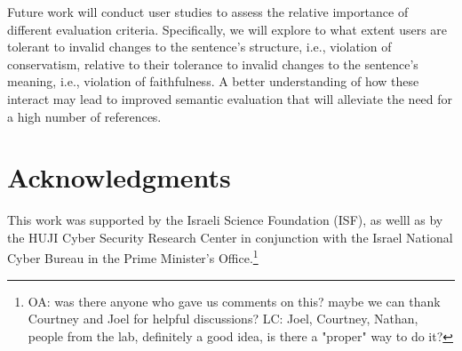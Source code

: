 \documentclass[a4paper, 11pt]{article}
\newcommand{\oa}[1]{\footnote{\color{red}OA: #1}}
\begin{document}
Future work will conduct user studies to assess the relative importance
of different evaluation criteria.
Specifically, we will explore to what extent users are
tolerant to invalid changes to the sentence's structure, i.e.,
violation of conservatism, relative to their tolerance to invalid changes 
to the sentence's meaning, i.e., violation of faithfulness.
A better understanding of how these interact
may lead to improved semantic evaluation that will alleviate the need
for a high number of references.

\section*{Acknowledgments}

This work was supported by the Israeli Science Foundation (ISF),
as welll as by the HUJI Cyber Security Research Center in conjunction with the Israel
National Cyber Bureau in the Prime Minister's Office.\oa{was there anyone who gave us comments on this? maybe we can thank
Courtney and Joel for helpful discussions? LC: Joel, Courtney, Nathan, people from the lab, definitely a good idea, is there a "proper" way to do it?}




\end{document}

